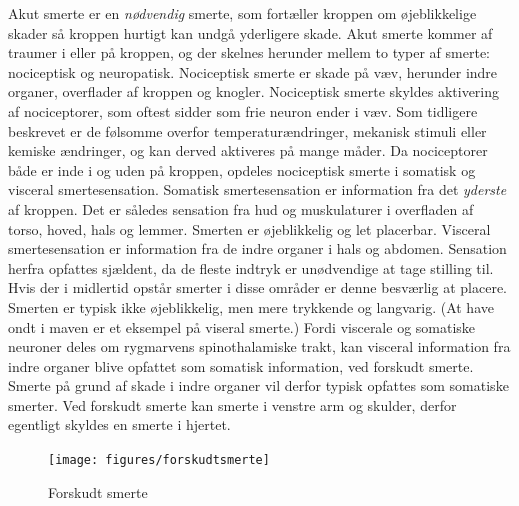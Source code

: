 Akut smerte er en \textit{nødvendig} smerte, som fortæller kroppen om øjeblikkelige skader så kroppen hurtigt kan undgå yderligere skade. Akut smerte kommer af traumer i eller på kroppen, og der skelnes herunder mellem to typer af smerte: nociceptisk og neuropatisk. Nociceptisk smerte er skade på væv, herunder indre organer, overflader af kroppen og knogler. Nociceptisk smerte skyldes aktivering af nociceptorer, som oftest sidder som frie neuron ender i væv. Som tidligere beskrevet er de følsomme overfor temperaturændringer, mekanisk stimuli eller kemiske ændringer, og kan derved aktiveres på mange måder. Da nociceptorer både er inde i og uden på kroppen, opdeles nociceptisk smerte i somatisk og visceral smertesensation. Somatisk smertesensation er information fra det \textit{yderste} af kroppen. Det er således sensation fra hud og muskulaturer i overfladen af torso, hoved, hals og lemmer. \citep{Martini} Smerten er øjeblikkelig og let placerbar. 
Visceral smertesensation er information fra de indre organer i hals og abdomen. Sensation herfra opfattes sjældent, da de fleste indtryk er unødvendige at tage stilling til. Hvis der i midlertid opstår smerter i disse områder er denne besværlig at placere. Smerten er typisk ikke øjeblikkelig, men mere trykkende og langvarig. (At have ondt i maven er et eksempel på viseral smerte.)
Fordi viscerale og somatiske neuroner deles om rygmarvens spinothalamiske trakt, kan visceral information fra indre organer blive opfattet som somatisk information, ved forskudt smerte. Smerte på grund af skade i indre organer vil derfor typisk opfattes som somatiske smerter. Ved forskudt smerte kan smerte i venstre arm og skulder, derfor egentligt skyldes en smerte i hjertet.

\begin{figure}[H]
	\caption{Forskudt smerte}
	\label{forskudtsmerte}
	\centering
	\texttt{[image: figures/forskudtsmerte]}
	\flushleft
	\textit{\citep{Martini}}
\end{figure}


